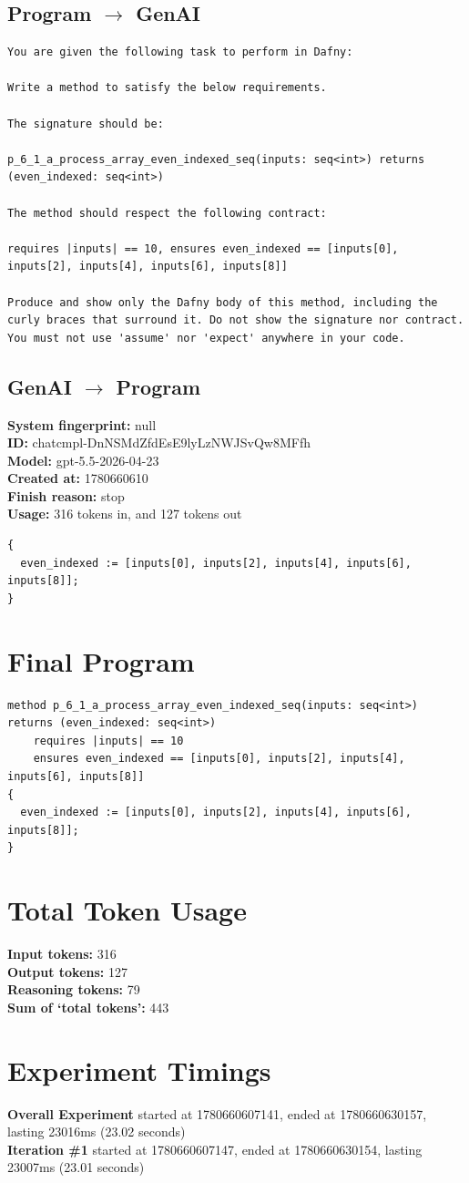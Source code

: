 \documentclass{article}
\begin{document}
\subsection*{Program $\rightarrow$ GenAI}
\begin{lstlisting}
You are given the following task to perform in Dafny:

Write a method to satisfy the below requirements.

The signature should be:

p_6_1_a_process_array_even_indexed_seq(inputs: seq<int>) returns (even_indexed: seq<int>)

The method should respect the following contract:

requires |inputs| == 10, ensures even_indexed == [inputs[0], inputs[2], inputs[4], inputs[6], inputs[8]]

Produce and show only the Dafny body of this method, including the curly braces that surround it. Do not show the signature nor contract. You must not use 'assume' nor 'expect' anywhere in your code.
\end{lstlisting}
\subsection*{GenAI $\rightarrow$ Program}
\textbf{System fingerprint: }null
\\\textbf{ID: }chatcmpl-DnNSMdZfdEsE9lyLzNWJSvQw8MFfh
\\\textbf{Model: }gpt-5.5-2026-04-23
\\\textbf{Created at: }1780660610
\\\textbf{Finish reason: }stop
\\\textbf{Usage: }316 tokens in, and 127 tokens out
\begin{lstlisting}
{
  even_indexed := [inputs[0], inputs[2], inputs[4], inputs[6], inputs[8]];
}
\end{lstlisting}
\section*{Final Program}
\begin{lstlisting}
method p_6_1_a_process_array_even_indexed_seq(inputs: seq<int>) returns (even_indexed: seq<int>)
	requires |inputs| == 10
	ensures even_indexed == [inputs[0], inputs[2], inputs[4], inputs[6], inputs[8]]
{
  even_indexed := [inputs[0], inputs[2], inputs[4], inputs[6], inputs[8]];
}
\end{lstlisting}
\section*{Total Token Usage}
\textbf{Input tokens: }316
\\\textbf{Output tokens: }127
\\\textbf{Reasoning tokens: }79
\\\textbf{Sum of `total tokens': }443
\section*{Experiment Timings}
\textbf{Overall Experiment} started at 1780660607141, ended at 1780660630157, lasting 23016ms (23.02 seconds)
\\\textbf{Iteration \#1} started at 1780660607147, ended at 1780660630154, lasting 23007ms (23.01 seconds)
\end{document}

